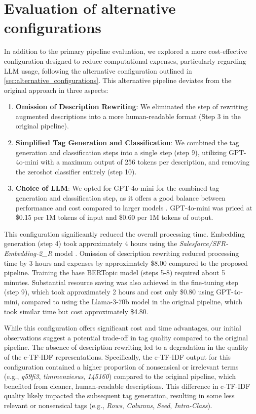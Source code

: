 \section{Evaluation of alternative configurations}
In addition to the primary pipeline evaluation, we explored a more cost-effective configuration designed to reduce computational expenses, particularly regarding LLM usage, following the alternative configuration outlined in \cref{sec:alternative_configurations}. This alternative pipeline deviates from the original approach in three aspects:

\begin{enumerate}
    \item \textbf{Omission of Description Rewriting}: We eliminated the step of rewriting augmented descriptions into a more human-readable format (Step 3 in the original pipeline).
    \item \textbf{Simplified Tag Generation and Classification}: We combined the tag generation and classification steps into a single step (step 9), utilizing GPT-4o-mini with a maximum output of 256 tokens per description, and removing the zeroshot classifier entirely (step 10).
    \item \textbf{Choice of LLM}: We opted for GPT-4o-mini for the combined tag generation and classification step, as it offers a good balance between performance and cost compared to larger models \cite{noauthor_gpt-4o_nodate}. GPT-4o-mini was priced at \$0.15 per 1M tokens of input and \$0.60 per 1M tokens of output.
\end{enumerate}

This configuration significantly reduced the overall processing time. Embedding generation (step 4) took approximately 4 hours using the \textit{Salesforce/SFR-Embedding-2\_R} model \cite{noauthor_salesforcesfr-embedding-2_r_2024}. Omission of description rewriting reduced processing time by 3 hours and expenses by approximately \$8.00 compared to the proposed pipeline. Training the base BERTopic model (steps 5-8) required about 5 minutes. Substantial resource saving was also achieved in the fine-tuning step (step 9), which took approximately 2 hours and cost only \$0.80 using GPT-4o-mini, compared to using the Llama-3-70b model in the original pipeline, which took similar time but cost approximately \$4.80.

While this configuration offers significant cost and time advantages, our initial observations suggest a potential trade-off in tag quality compared to the original pipeline. The absence of description rewriting led to a degradation in the quality of the c-TF-IDF representations. Specifically, the c-TF-IDF output for this configuration contained a higher proportion of nonsensical or irrelevant terms (e.g., \textit{q59fi3}, \textit{timmenziesus}, \textit{145160}) compared to the original pipeline, which benefited from cleaner, human-readable descriptions. This difference in c-TF-IDF quality likely impacted the subsequent tag generation, resulting in some less relevant or nonsensical tags (e.g., \textit{Rows}, \textit{Columns}, \textit{Seed}, \textit{Intra-Class}).

